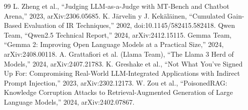\documentclass[conference]{IEEEtran}
\begin{document}
\begin{thebibliography}{99}
 L. Zheng et al., ``Judging LLM-as-a-Judge with MT-Bench and Chatbot Arena,'' 2023, arXiv:2306.05685.
 K. J\"arvelin y J. Kek\"al\"ainen, ``Cumulated Gain-Based Evaluation of IR Techniques,'' 2002, doi:10.1145/582415.582418.
 Qwen Team, ``Qwen2.5 Technical Report,'' 2024, arXiv:2412.15115.
 Gemma Team, ``Gemma 2: Improving Open Language Models at a Practical Size,'' 2024, arXiv:2408.00118.
 A. Grattafiori et al. (Llama Team), ``The Llama 3 Herd of Models,'' 2024, arXiv:2407.21783.
 K. Greshake et al., ``Not What You've Signed Up For: Compromising Real-World LLM-Integrated Applications with Indirect Prompt Injection,'' 2023, arXiv:2302.12173.
 W. Zou et al., ``PoisonedRAG: Knowledge Corruption Attacks to Retrieval-Augmented Generation of Large Language Models,'' 2024, arXiv:2402.07867.
\end{thebibliography}
\end{document}
